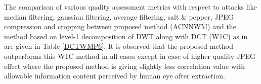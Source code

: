 The comparison of various quality assessment metrics with respect to attacks like median filtering, gaussian filtering, average filtering, salt \& pepper, JPEG compression and cropping between proposed method (ACNNWM) and the method based on level-1 decomposition of DWT along with DCT (W1C) as in \cite{P6} are given in Table \ref{DCTWMP6}. It is observed that the proposed method outperforms this W1C method in all cases except in case of higher quality JPEG effect where the proposed method is giving slightly less correlation value with allowable information content perceived by human eye after extraction.\\


\begin{table*}
\caption{Comparison with W1C Method as in \cite{P6}}
\smallskip\noindent
{}
\end{table*}


